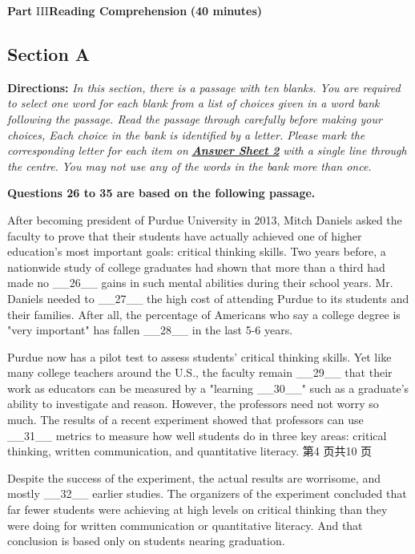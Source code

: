 \documentclass[UTF8,11pt]{ctexart}
\begin{document}
\textbf{Part} III\textbf{Reading Comprehension} \textbf{(40 minutes)}


\subsection*{\textbf{Section A}}


\textbf{Directions:}\textit{ In this section, there is a passage with ten blanks. You are required to select one word} \textit{for each blank from a list of choices given in a word bank following the passage. Read the passage} \textit{through carefully before making your choices, Each choice in the bank is identified by a letter. Please} \textit{mark the corresponding letter for each item on}\textbf{\textit{ }}\textbf{\textit{\uline{Answer Sheet 2}}}\textit{ with a single line through the centre.} \textit{You may not use any of the words in the bank more than once.}


\textbf{Questions 26 to 35 are based on the following passage.}


After becoming president of Purdue University in 2013, Mitch Daniels asked the faculty to prove that their students have actually achieved one of higher education's most important goals: critical thinking skills. Two years before, a nationwide study of college graduates had shown that more than a third had made no \_\_26\_\_ gains in such mental abilities during their school years. Mr. Daniels needed to \_\_27\_\_ the high cost of attending Purdue to its students and their families. After all, the percentage of Americans who say a college degree is "very important" has fallen \_\_28\_\_ in the last 5-6 years.


Purdue now has a pilot test to assess students' critical thinking skills. Yet like many college teachers around the U.S., the faculty remain \_\_29\_\_ that their work as educators can be measured by a "learning \_\_30\_\_" such as a graduate's ability to investigate and reason. However, the professors need not worry so much. The results of a recent experiment showed that professors can use \_\_31\_\_ metrics to measure how well students do in three key areas: critical thinking, written communication, and quantitative literacy. 第4 页共10 页


Despite the success of the experiment, the actual results are worrisome, and mostly \_\_32\_\_ earlier studies. The organizers of the experiment concluded that far fewer students were achieving at high levels on critical thinking than they were doing for written communication or quantitative literacy. And that conclusion is based only on students nearing graduation.
\end{document}

